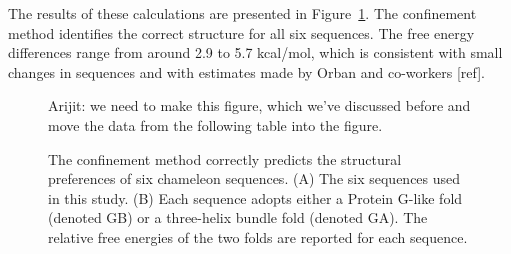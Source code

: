 \documentclass[12pt]{article}
\newcommand{\Justin}[1]{\color{blue}#1\normalcolor}
\begin{document}
The results of these calculations are presented in Figure~\ref{fig:orban}. The confinement method
identifies the correct structure for all six sequences. The free energy differences range from
around 2.9 to 5.7 kcal/mol, which is consistent with small changes in sequences and with estimates
made by Orban and co-workers [ref].

\begin{figure}
\label{fig:orban}

\caption{The confinement method correctly predicts the structural preferences of six chameleon
sequences. (A) The six sequences used in this study. (B) Each sequence adopts either a Protein
G-like fold (denoted GB) or a three-helix bundle fold (denoted GA). The relative free energies of
the two folds are reported for each sequence.}

\Justin{Arijit: we need to make this figure, which we've discussed before and move the data from the
following table into the figure.}
\end{figure}

\end{document}

